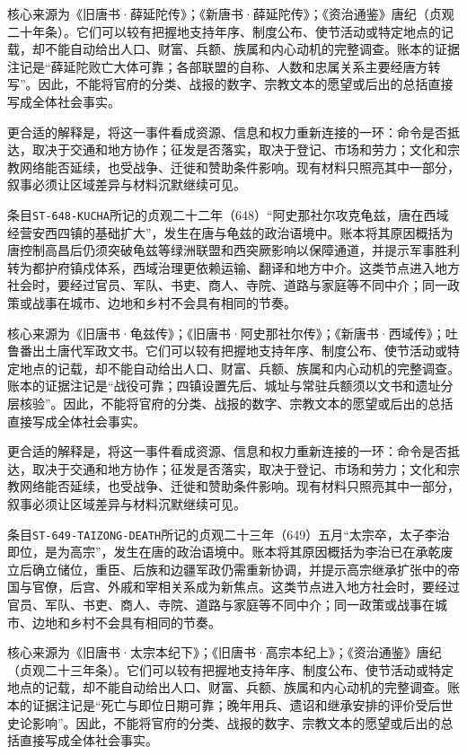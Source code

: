 核心来源为《旧唐书·薛延陀传》；《新唐书·薛延陀传》；《资治通鉴》唐纪（贞观二十年条）。它们可以较有把握地支持年序、制度公布、使节活动或特定地点的记载，却不能自动给出人口、财富、兵额、族属和内心动机的完整调查。账本的证据注记是“薛延陀败亡大体可靠；各部联盟的自称、人数和忠属关系主要经唐方转写”。因此，不能将官府的分类、战报的数字、宗教文本的愿望或后出的总括直接写成全体社会事实。

更合适的解释是，将这一事件看成资源、信息和权力重新连接的一环：命令是否抵达，取决于交通和地方协作；征发是否落实，取决于登记、市场和劳力；文化和宗教网络能否延续，也受战争、迁徙和赞助条件影响。现有材料只照亮其中一部分，叙事必须让区域差异与材料沉默继续可见。


条目\texttt{ST-648-KUCHA}所记的贞观二十二年（648）“阿史那社尔攻克龟兹，唐在西域经营安西四镇的基础扩大”，发生在唐与龟兹的政治语境中。账本将其原因概括为唐控制高昌后仍须突破龟兹等绿洲联盟和西突厥影响以保障通道，并提示军事胜利转为都护府镇戍体系，西域治理更依赖运输、翻译和地方中介。这类节点进入地方社会时，要经过官员、军队、书吏、商人、寺院、道路与家庭等不同中介；同一政策或战事在城市、边地和乡村不会具有相同的节奏。

核心来源为《旧唐书·龟兹传》；《旧唐书·阿史那社尔传》；《新唐书·西域传》；吐鲁番出土唐代军政文书。它们可以较有把握地支持年序、制度公布、使节活动或特定地点的记载，却不能自动给出人口、财富、兵额、族属和内心动机的完整调查。账本的证据注记是“战役可靠；四镇设置先后、城址与常驻兵额须以文书和遗址分层核验”。因此，不能将官府的分类、战报的数字、宗教文本的愿望或后出的总括直接写成全体社会事实。

更合适的解释是，将这一事件看成资源、信息和权力重新连接的一环：命令是否抵达，取决于交通和地方协作；征发是否落实，取决于登记、市场和劳力；文化和宗教网络能否延续，也受战争、迁徙和赞助条件影响。现有材料只照亮其中一部分，叙事必须让区域差异与材料沉默继续可见。


条目\texttt{ST-649-TAIZONG-DEATH}所记的贞观二十三年（649）五月“太宗卒，太子李治即位，是为高宗”，发生在唐的政治语境中。账本将其原因概括为李治已在承乾废立后确立储位，重臣、后族和边疆军政仍需重新协调，并提示高宗继承扩张中的帝国与官僚，后宫、外戚和宰相关系成为新焦点。这类节点进入地方社会时，要经过官员、军队、书吏、商人、寺院、道路与家庭等不同中介；同一政策或战事在城市、边地和乡村不会具有相同的节奏。

核心来源为《旧唐书·太宗本纪下》；《旧唐书·高宗本纪上》；《资治通鉴》唐纪（贞观二十三年条）。它们可以较有把握地支持年序、制度公布、使节活动或特定地点的记载，却不能自动给出人口、财富、兵额、族属和内心动机的完整调查。账本的证据注记是“死亡与即位日期可靠；晚年用兵、遗诏和继承安排的评价受后世史论影响”。因此，不能将官府的分类、战报的数字、宗教文本的愿望或后出的总括直接写成全体社会事实。

